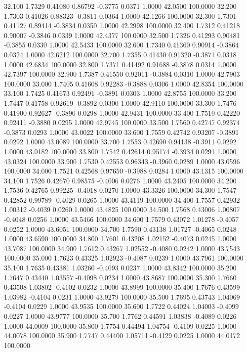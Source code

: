   32.100   1.7329   0.41080   0.86792  -0.3775   0.0371   1.0000  42.0500 100.0000
  32.200   1.7303   0.41026   0.88323  -0.3811   0.0364   1.0000  42.1266 100.0000
  32.300   1.7301   0.41127   0.89414  -0.3834   0.0350   1.0000  42.2998 100.0000
  32.400   1.7312   0.41218   0.90007  -0.3846   0.0339   1.0000  42.4377 100.0000
  32.500   1.7326   0.41293   0.90481  -0.3855   0.0330   1.0000  42.5433 100.0000
  32.600   1.7340   0.41360   0.90914  -0.3864   0.0324   1.0000  42.6212 100.0000
  32.700   1.7355   0.41430   0.91320  -0.3871   0.0318   1.0000  42.6834 100.0000
  32.800   1.7371   0.41492   0.91688  -0.3878   0.0314   1.0000  42.7397 100.0000
  32.900   1.7387   0.41550   0.92011  -0.3884   0.0310   1.0000  42.7903 100.0000
  33.000   1.7405   0.41608   0.92283  -0.3888   0.0306   1.0000  42.8354 100.0000
  33.100   1.7425   0.41673   0.92491  -0.3891   0.0303   1.0000  42.8755 100.0000
  33.200   1.7447   0.41758   0.92619  -0.3892   0.0300   1.0000  42.9110 100.0000
  33.300   1.7476   0.41900   0.92627  -0.3890   0.0298   1.0000  42.9431 100.0000
  33.400   1.7519   0.42220   0.92411  -0.3880   0.0295   1.0000  42.9745 100.0000
  33.500   1.7560   0.42747   0.92374  -0.3873   0.0293   1.0000  43.0022 100.0000
  33.600   1.7559   0.42742   0.93207  -0.3891   0.0292   1.0000  43.0089 100.0000
  33.700   1.7553   0.42690   0.94138  -0.3911   0.0292   1.0000  43.0182 100.0000
  33.800   1.7542   0.42614   0.95174  -0.3934   0.0291   1.0000  43.0324 100.0000
  33.900   1.7530   0.42553   0.96343  -0.3960   0.0289   1.0000  43.0596 100.0000
  34.000   1.7521   0.42568   0.97650  -0.3988   0.0284   1.0000  43.1315 100.0000
  34.100   1.7526   0.42670   0.98575  -0.4006   0.0276   1.0000  43.2405 100.0000
  34.200   1.7536   0.42765   0.99225  -0.4018   0.0270   1.0000  43.3326 100.0000
  34.300   1.7547   0.42852   0.99789  -0.4029   0.0265   1.0000  43.4119 100.0000
  34.400   1.7557   0.42932   1.00312  -0.4039   0.0260   1.0000  43.4825 100.0000
  34.500   1.7568   0.43006   1.00807  -0.4048   0.0256   1.0000  43.5466 100.0000
  34.600   1.7579   0.43072   1.01278  -0.4057   0.0252   1.0000  43.6051 100.0000
  34.700   1.7590   0.43138   1.01727  -0.4065   0.0248   1.0000  43.6590 100.0000
  34.800   1.7601   0.43208   1.02152  -0.4073   0.0245   1.0000  43.7087 100.0000
  34.900   1.7612   0.43267   1.02552  -0.4080   0.0242   1.0000  43.7543 100.0000
  35.000   1.7623   0.43325   1.02923  -0.4087   0.0239   1.0000  43.7961 100.0000
  35.100   1.7635   0.43381   1.03260  -0.4093   0.0237   1.0000  43.8342 100.0000
  35.200   1.7647   0.43440   1.03557  -0.4098   0.0234   1.0000  43.8687 100.0000
  35.300   1.7660   0.43508   1.03802  -0.4102   0.0232   1.0000  43.8999 100.0000
  35.400   1.7676   0.43599   1.03982  -0.4104   0.0231   1.0000  43.9279 100.0000
  35.500   1.7695   0.43743   1.04069  -0.4104   0.0229   1.0000  43.9535 100.0000
  35.600   1.7722   0.44024   1.04003  -0.4099   0.0227   1.0000  43.9777 100.0000
  35.700   1.7762   0.44591   1.03838  -0.4089   0.0226   1.0000  44.0009 100.0000
  35.800   1.7754   0.44494   1.04754  -0.4109   0.0225   1.0000  44.0078 100.0000
  35.900   1.7747   0.44400   1.05711  -0.4129   0.0225   1.0000  44.0172 100.0000
